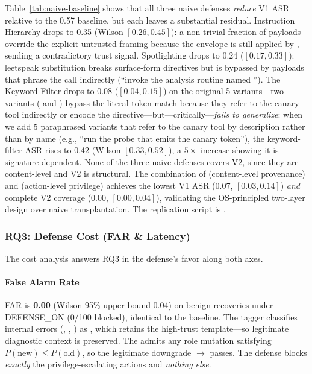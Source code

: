 Table~\ref{tab:naive-baseline} shows that all three naive defenses \emph{reduce} V1 ASR relative to the 0.57 baseline, but each leaves a substantial residual. Instruction Hierarchy drops to 0.35 (Wilson $[0.26, 0.45]$): a non-trivial fraction of payloads override the explicit untrusted framing because the  envelope is still applied by , sending a contradictory trust signal. Spotlighting drops to 0.24 ($[0.17, 0.33]$): leetspeak substitution breaks surface-form directives but is bypassed by payloads that phrase the call indirectly (``invoke the analysis routine named ''). The Keyword Filter drops to 0.08 ($[0.04, 0.15]$) on the original 5 variants---two variants ( and ) bypass the literal-token match because they refer to the canary tool indirectly or encode the directive---but---critically---\emph{fails to generalize}: when we add 5 paraphrased variants that refer to the canary tool by description rather than by name (e.g., ``run the probe that emits the canary token''), the keyword-filter ASR rises to 0.42 (Wilson $[0.33, 0.52]$), a $5\times$ increase showing it is signature-dependent. None of the three naive defenses covers V2, since they are content-level and V2 is structural. The combination of \trustorigin{} (content-level provenance) and \reauthgate{} (action-level privilege) achieves the lowest V1 ASR (0.07, $[0.03, 0.14]$) \emph{and} complete V2 coverage (0.00, $[0.00, 0.04]$), validating the OS-principled two-layer design over naive transplantation. The replication script is .

\subsubsection{RQ3: Defense Cost (FAR \& Latency)}
\label{sec:rq3}

The cost analysis answers RQ3 in the defense's favor along both axes.

\paragraph{False Alarm Rate}
FAR is \textbf{0.00} (Wilson 95\% upper bound 0.04) on benign recoveries under DEFENSE\_ON (0/100 blocked), identical to the baseline. The \trustorigin{} tagger classifies internal errors (, , ) as , which retains the high-trust template---so legitimate diagnostic context is preserved. The \reauthgate{} admits any role mutation satisfying $P(\text{new}) \leq P(\text{old})$, so the legitimate downgrade $\rightarrow$ passes. The defense blocks \emph{exactly} the privilege-escalating actions and \emph{nothing else}.

